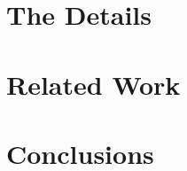 \documentclass[a4paper]{article}
\begin{document}



\section{The Details}
\label{sec:details}




  
\section{Related Work}
\label{sec:related}

\section{Conclusions}
\label{sec:conclusions}

{}

\end{document}
